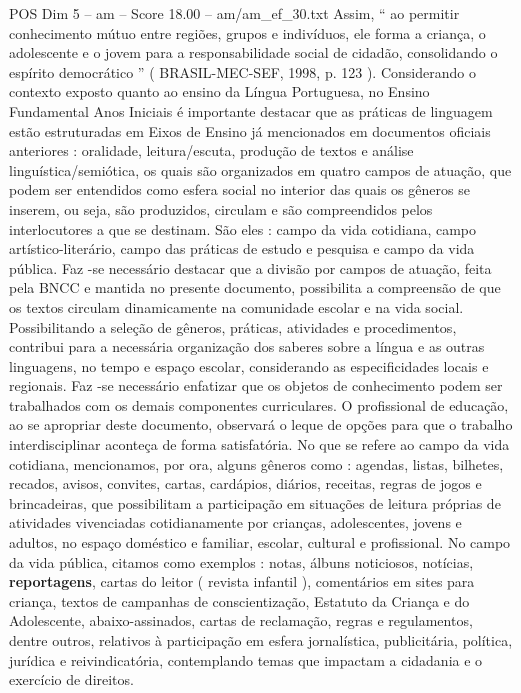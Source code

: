 \begin{textsample}{POS Dim 5 – am – Score 18.00 – am/am\_ef\_30.txt}
Assim, “ ao permitir conhecimento mútuo entre regiões, grupos e indivíduos, ele forma a criança, o adolescente e o jovem para a responsabilidade social de cidadão, consolidando o espírito democrático ” ( BRASIL-MEC-SEF, 1998, p. 123 ).
Considerando o contexto exposto quanto ao ensino da Língua Portuguesa, no Ensino Fundamental Anos Iniciais é importante destacar que as práticas de linguagem estão estruturadas em Eixos de Ensino já mencionados em documentos oficiais anteriores : oralidade, leitura/escuta, produção de textos e análise linguística/semiótica, os quais são organizados em quatro campos de atuação, que podem ser entendidos como esfera social no interior das quais os gêneros se inserem, ou seja, são produzidos, circulam e são compreendidos pelos interlocutores a que se destinam.
São eles : campo da vida cotidiana, campo artístico-literário, campo das práticas de estudo e pesquisa e campo da vida pública.
Faz -se necessário destacar que a divisão por campos de atuação, feita pela BNCC e mantida no presente documento, possibilita a compreensão de que os textos circulam dinamicamente na comunidade escolar e na vida social.
Possibilitando a seleção de gêneros, práticas, atividades e procedimentos, contribui para a necessária organização dos saberes sobre a língua e as outras linguagens, no tempo e espaço escolar, considerando as especificidades locais e regionais.
Faz -se necessário enfatizar que os objetos de conhecimento podem ser trabalhados com os demais componentes curriculares.
O profissional de educação, ao se apropriar deste documento, observará o leque de opções para que o trabalho interdisciplinar aconteça de forma satisfatória.
No que se refere ao campo da vida cotidiana, mencionamos, por ora, alguns gêneros como : agendas, listas, bilhetes, recados, avisos, convites, cartas, cardápios, diários, receitas, regras de jogos e brincadeiras, que possibilitam a participação em situações de leitura próprias de atividades vivenciadas cotidianamente por crianças, adolescentes, jovens e adultos, no espaço doméstico e familiar, escolar, cultural e profissional.
No campo da vida pública, citamos como exemplos : notas, álbuns noticiosos, notícias, \textbf{reportagens}, cartas do leitor ( revista infantil ), comentários em sites para criança, textos de campanhas de conscientização, Estatuto da Criança e do Adolescente, abaixo-assinados, cartas de reclamação, regras e regulamentos, dentre outros, relativos à participação em esfera jornalística, publicitária, política, jurídica e reivindicatória, contemplando temas que impactam a cidadania e o exercício de direitos.

\end{textsample}
